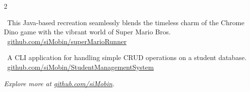 \begin{paracol}{2}
    \divider

    \small \faChevronRight \ This Java-based recreation seamlessly blends the timeless charm of the Chrome Dino game with the vibrant world of Super Mario Bros. \\[0.5em]
    \small \faGithub \ \href{https://github.com/siMobin/superMarioRunner}{github.com/siMobin/superMarioRunner}

    \divider

    \small \faChevronRight \ A CLI application for handling simple CRUD operations on a student database. \\[0.5em]
    \small \faGithub \ \href{https://github.com/siMobin/StudentManagementSystem}{github.com/siMobin/StudentManagementSystem}

\end{paracol}

\vspace{4mm}
\centering \faFire \textit{Explore more at \href{https://github.com/siMobin/}{github.com/siMobin}.}\faFire